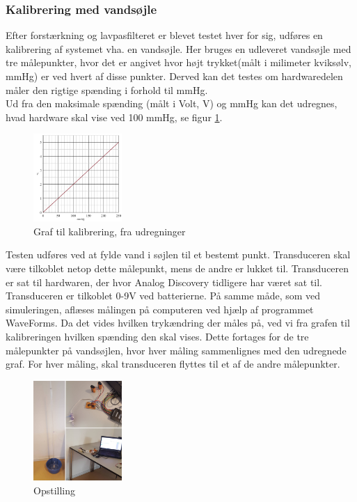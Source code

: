 \subsubsection{Kalibrering med vandsøjle}
Efter forstærkning og lavpasfilteret er blevet testet hver for sig, udføres en kalibrering af systemet vha. en vandsøjle. Her bruges en udleveret vandsøjle med tre målepunkter, hvor det er angivet hvor højt trykket(målt i milimeter kviksølv, mmHg) er ved hvert af disse punkter. Derved kan det testes om hardwaredelen måler den rigtige spænding i forhold til mmHg. \\
Ud fra den maksimale spænding (målt i Volt, V) og mmHg kan det udregnes, hvad hardware skal vise ved 100 mmHg, se figur \ref{fig:graf_vandtest}. 
\begin{figure}[H]
	\centering
	\includegraphics[width=0.3\textwidth]{Figurer/graf_vandtest}
	\caption{Graf til kalibrering, fra udregninger}
	\label{fig:graf_vandtest}
\end{figure}
Testen udføres ved at fylde vand i søjlen til et bestemt punkt. Transduceren skal være tilkoblet netop dette målepunkt, mens de andre er lukket til. Transduceren er sat til hardwaren, der hvor Analog Discovery tidligere har været sat til. Transduceren er tilkoblet 0-9V ved batterierne. På samme måde, som ved simuleringen, aflæses målingen på computeren ved hjælp af programmet WaveForms. Da det vides hvilken trykændring der måles på, ved vi fra grafen til kalibreringen hvilken spænding den skal vises. Dette fortages for de tre målepunkter på vandsøjlen, hvor hver måling sammenlignes med den udregnede graf. For hver måling, skal transduceren flyttes til et af de andre målepunkter.  
\begin{figure}[H]
	\centering
	\includegraphics[width=0.3\textwidth]{Figurer/vandtest_opstilling}
	\caption{Opstilling}
	\label{fig:vandtest_opstilling}
\end{figure} 
